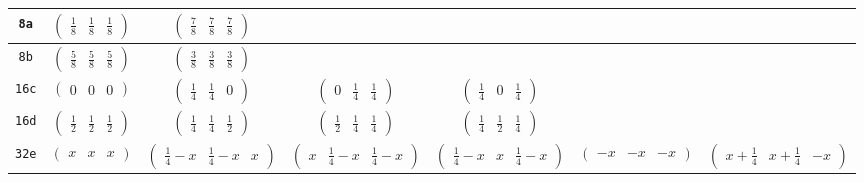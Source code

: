 \documentclass[fleqn,9pt,landscape]{jsarticle}
\begin{document}
\begin{center}
\begin{longtable}{ccccccc}
{\tt 8a} & $ \begin{pmatrix} \frac{1}{8} & \frac{1}{8} & \frac{1}{8} \end{pmatrix} $ & $ \begin{pmatrix} \frac{7}{8} & \frac{7}{8} & \frac{7}{8} \end{pmatrix} $ & $  $ & $  $ & $  $ & $  $ \\ \hline
{\tt 8b} & $ \begin{pmatrix} \frac{5}{8} & \frac{5}{8} & \frac{5}{8} \end{pmatrix} $ & $ \begin{pmatrix} \frac{3}{8} & \frac{3}{8} & \frac{3}{8} \end{pmatrix} $ & $  $ & $  $ & $  $ & $  $ \\ \hline
{\tt 16c} & $ \begin{pmatrix} 0 & 0 & 0 \end{pmatrix} $ & $ \begin{pmatrix} \frac{1}{4} & \frac{1}{4} & 0 \end{pmatrix} $ & $ \begin{pmatrix} 0 & \frac{1}{4} & \frac{1}{4} \end{pmatrix} $ & $ \begin{pmatrix} \frac{1}{4} & 0 & \frac{1}{4} \end{pmatrix} $ & $  $ & $  $ \\ \hline
{\tt 16d} & $ \begin{pmatrix} \frac{1}{2} & \frac{1}{2} & \frac{1}{2} \end{pmatrix} $ & $ \begin{pmatrix} \frac{1}{4} & \frac{1}{4} & \frac{1}{2} \end{pmatrix} $ & $ \begin{pmatrix} \frac{1}{2} & \frac{1}{4} & \frac{1}{4} \end{pmatrix} $ & $ \begin{pmatrix} \frac{1}{4} & \frac{1}{2} & \frac{1}{4} \end{pmatrix} $ & $  $ & $  $ \\ \hline
{\tt 32e} & $ \begin{pmatrix} x & x & x \end{pmatrix} $ & $ \begin{pmatrix} \frac{1}{4} - x & \frac{1}{4} - x & x \end{pmatrix} $ & $ \begin{pmatrix} x & \frac{1}{4} - x & \frac{1}{4} - x \end{pmatrix} $ & $ \begin{pmatrix} \frac{1}{4} - x & x & \frac{1}{4} - x \end{pmatrix} $ & $ \begin{pmatrix} - x & - x & - x \end{pmatrix} $ & $ \begin{pmatrix} x + \frac{1}{4} & x + \frac{1}{4} & - x \end{pmatrix} $ \\

\end{longtable}
\end{center}
\end{document}
